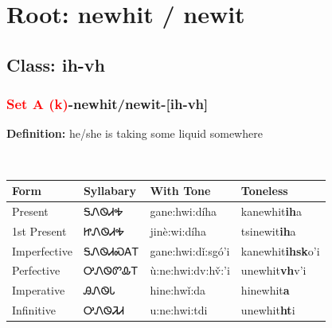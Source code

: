 \needspace{4in}
\section*{Root: newhit / newit}
\nopagebreak
{}
\needspace{3in}
\subsection*{Class: ih-vh}
\nopagebreak
\needspace{2in}
\subsubsection*{\textcolor{Red}{Set A (k)}{-}\textbf{newhit/newit}{-}[ih-vh]}
\nopagebreak
\textbf{Definition: } he/she is taking some liquid somewhere
\\[0.5em]
\begin{tabularx}{\textwidth}{l X X X}%
\toprule%
\textbf{Form}&\textbf{Syllabary}&\textbf{With Tone}&\textbf{Toneless}\\%
\midrule%
Present&ᎦᏁᏫᏗᎭ&gane:hwi:díha&kanewhit\textbf{ih}a\\%
1st Present&ᏥᏁᏫᏗᎭ&jinè:wi:díha&tsinewit\textbf{ih}a\\%
Imperfective&ᎦᏁᏫᏗᏍᎪᎢ&gane:hwi:dǐ:sgó’i&kanewhit\textbf{ihsk}o'i\\%
Perfective&ᎤᏁᏫᏛᎲᎢ&ù:ne:hwi:dv:hv̌:’i&unewhit\textbf{vh}v'i\\%
Imperative&ᎯᏁᏫᏓ&hine:hwǐ:da&hinewhit\textbf{a}\\%
Infinitive&ᎤᏁᏫᏘᏗ&u:ne:hwi:tdi&unewhit\textbf{ht}i\\%
\bottomrule%
\end{tabularx}
\\[1em]